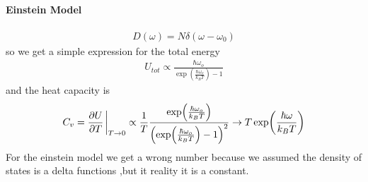 \documentclass[../main.tex]{subfiles}
\begin{document}
\paragraph*{Einstein Model}
\begin{align*}
  D(\omega) = N \delta(\omega - \omega_0)
\end{align*}
so we get a simple expression for the total energy
\begin{align*}
    U_{tot} \propto \frac{\hbar \omega_o}{\exp(\frac{\hbar \omega_o}{k_B T}) - 1}
\end{align*}
and the heat capacity is
\begin{align*}
    C_v = \pdv{U}{T}\eval_{T \to 0}
    \propto \frac{1}{T} \frac{\exp(\frac{\hbar \omega_o}{k_B T})}{\qt(\exp(\frac{\hbar \omega_o}{k_B T}) - 1)^2} 
    \to T\exp(\frac{\hbar\omega}{k_B T})
\end{align*}
For the einstein model we get a wrong number because we assumed the density of states is a delta functions
,but it reality it is a constant.
\end{document}

